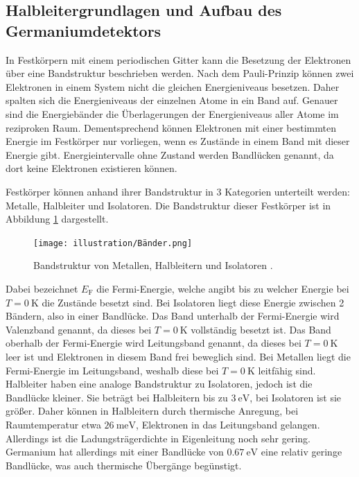 \subsection{Halbleitergrundlagen und Aufbau des Germaniumdetektors}

In Festkörpern mit einem periodischen Gitter kann die Besetzung der Elektronen über eine Bandstruktur beschrieben werden.
Nach dem Pauli-Prinzip können zwei Elektronen in einem System nicht die gleichen Energieniveaus besetzen. Daher spalten sich 
die Energieniveaus der einzelnen Atome in ein Band auf. Genauer sind die Energiebänder die Überlagerungen der Energieniveaus aller Atome im 
reziproken Raum. Dementsprechend können Elektronen mit einer bestimmten Energie im Festkörper nur vorliegen, wenn es Zustände in einem Band mit dieser 
Energie gibt. Energieintervalle ohne Zustand werden Bandlücken genannt, da dort keine Elektronen existieren können.

\noindent Festkörper können anhand ihrer Bandstruktur in 3 Kategorien unterteilt werden: Metalle, Halbleiter und Isolatoren.
Die Bandstruktur dieser Festkörper ist in Abbildung \ref{fig:Band} dargestellt.
\begin{figure}[H]
    \centering
    \texttt{[image: illustration/Bänder.png]}
    \caption{Bandstruktur von Metallen, Halbleitern und Isolatoren \cite{demtröder}.}
    \label{fig:Band}
\end{figure}
\noindent Dabei bezeichnet $E_\text{F}$ die Fermi-Energie, welche angibt bis zu welcher Energie bei $T=\qty{0}{\kelvin}$ die Zustände besetzt sind.
Bei Isolatoren liegt diese Energie zwischen 2 Bändern, also in einer Bandlücke. Das Band unterhalb der Fermi-Energie wird Valenzband genannt, 
da dieses bei $T=\qty{0}{\kelvin}$ vollständig besetzt ist. Das Band oberhalb der Fermi-Energie wird Leitungsband genannt, da dieses bei $T=\qty{0}{\kelvin}$ leer ist und 
Elektronen in diesem Band frei beweglich sind. Bei Metallen liegt die Fermi-Energie im Leitungsband, weshalb diese bei $T=\qty{0}{\kelvin}$ leitfähig sind.
Halbleiter haben eine analoge Bandstruktur zu Isolatoren, jedoch ist die Bandlücke kleiner. Sie beträgt bei Halbleitern bis zu $\qty{3}{\eV}$, bei Isolatoren 
ist sie größer. Daher können in Halbleitern durch thermische Anregung, bei Raumtemperatur etwa $\qty{26}{\milli\eV}$, Elektronen in das Leitungsband gelangen. 
Allerdings ist die Ladungsträgerdichte in Eigenleitung noch sehr gering. Germanium hat allerdings mit einer Bandlücke von $\qty{0.67}{\eV}$ eine relativ geringe Bandlücke, was auch thermische Übergänge 
begünstigt.

